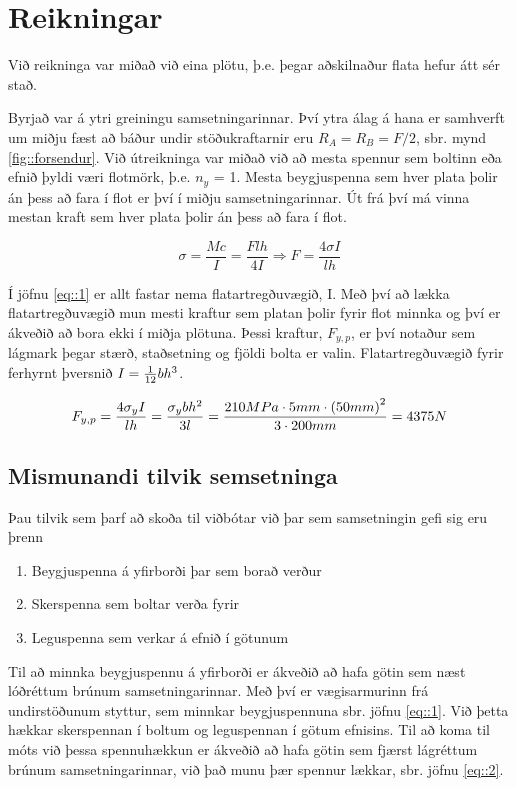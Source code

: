 \section{Reikningar}\label{ch::reikningar}

Við reikninga var miðað við eina plötu, þ.e. þegar aðskilnaður flata hefur átt sér stað. 

Byrjað var á ytri greiningu samsetningarinnar. Því ytra álag á hana er samhverft um miðju fæst að báður undir stöðukraftarnir eru $R_{A} = R_{B} = F/2$, sbr. mynd \ref{fig::forsendur}. Við útreikninga var miðað við að mesta spennur sem boltinn eða efnið þyldi væri flotmörk, þ.e. $n_y$ = 1. Mesta beygjuspenna sem hver plata þolir án þess að fara í flot er því í miðju samsetningarinnar. Út frá því má vinna mestan kraft sem hver plata þolir án þess að fara í flot.

\begin{equation}
	\sigma = \frac{M c}{I} = \frac{F l h}{4I} \Rightarrow F = \frac{4 \sigma I}{l h}
	\label{eq::1}
\end{equation}

Í jöfnu \ref{eq::1} er allt fastar nema flatartregðuvægið, I. Með því að lækka flatartregðuvægið mun mesti kraftur sem platan þolir fyrir flot minnka og því er ákveðið að bora ekki í miðja plötuna. Þessi kraftur, $F_{y,p}$, er því notaður sem lágmark þegar stærð, staðsetning og fjöldi bolta er valin. Flatartregðuvægið fyrir ferhyrnt þversnið $I = {1 \over 12}bh^3$.

\[
	F_{y,p} = \frac{4  \sigma_y I}{l h} = {\sigma_y b h^2 \over 3 l} = {210 MPa \cdot 5 mm \cdot \left(50mm\right)^2 \over 3 \cdot 200mm} = 4375N
\]

\subsection{Mismunandi tilvik semsetninga}

Þau tilvik sem þarf að skoða til viðbótar við þar sem samsetningin gefi sig eru þrenn

\begin{enumerate}
	\item Beygjuspenna á yfirborði þar sem borað verður
	\item Skerspenna sem boltar verða fyrir
	\item Leguspenna sem verkar á efnið í götunum
\end{enumerate}

Til að minnka beygjuspennu á yfirborði er ákveðið að hafa götin sem næst lóðréttum brúnum samsetningarinnar. Með því er vægisarmurinn frá undirstöðunum styttur, sem minnkar beygjuspennuna sbr. jöfnu \ref{eq::1}. Við þetta hækkar skerspennan í boltum og leguspennan í götum efnisins. Til að koma til móts við þessa spennuhækkun er ákveðið að hafa götin sem fjærst lágréttum brúnum samsetningarinnar, við það munu þær spennur lækkar, sbr. jöfnu \ref{eq::2}.

